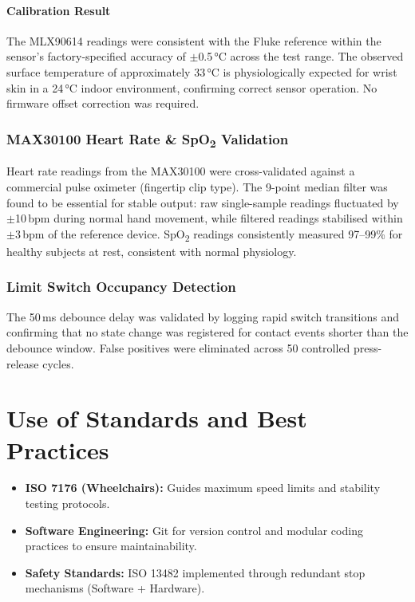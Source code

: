 \documentclass[12pt,a4paper]{report}
\begin{document}
\paragraph{Calibration Result}

The MLX90614 readings were consistent with the Fluke reference within the sensor's
factory-specified accuracy of $\pm$0.5\,°C across the test range. The observed
surface temperature of approximately 33\,°C is physiologically expected for wrist
skin in a 24\,°C indoor environment, confirming correct sensor operation.
No firmware offset correction was required. 

\subsubsection{MAX30100 Heart Rate \& SpO\textsubscript{2} Validation}

Heart rate readings from the MAX30100 were cross-validated against a commercial
pulse oximeter (fingertip clip type). The 9-point median filter was found to be
essential for stable output: raw single-sample readings fluctuated by $\pm$10\,bpm
during normal hand movement, while filtered readings stabilised within $\pm$3\,bpm
of the reference device. SpO\textsubscript{2} readings consistently measured
97–99\% for healthy subjects at rest, consistent with normal physiology.

\subsubsection{Limit Switch Occupancy Detection}

The 50\,ms debounce delay was validated by logging rapid switch transitions and
confirming that no state change was registered for contact events shorter than the
debounce window. False positives were eliminated across 50 controlled press-release
cycles.



\section{Use of Standards and Best Practices}

\begin{itemize}
    \item \textbf{ISO 7176 (Wheelchairs):} Guides maximum speed limits and stability testing protocols.
    \item \textbf{Software Engineering:} Git for version control and modular coding practices to ensure maintainability.
    \item \textbf{Safety Standards:} ISO 13482 implemented through redundant stop mechanisms (Software + Hardware).
\end{itemize}
\end{document}
